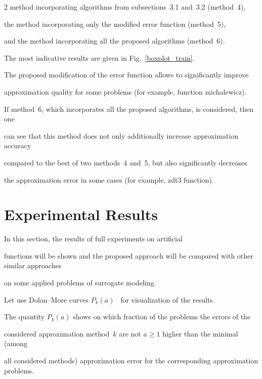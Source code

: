 \begin{multicols}{2}
method incorporating algorithms from subsections~3.1 and~3.2 (method~4), 

the method incorporating only the modified error function (method~5),  

and the method incorporating all the proposed algorithms  (method~6).







The most indicative results are given in Fig.~\ref{boxplot_train}.

The proposed modification of the error function allows to significantly improve 

approximation quality for some problems (for example, function michalewicz).

If method~6, which incorporates all the proposed algorithms,   is considered, then one 

can see that this method does not only additionally increase approximation accuracy 

compared to the best of two methods~4 and~5, but also significantly decreases 

the approximation error in some cases (for example, zdt3 function).



\section{Experimental Results}

\label{experiments}



\noindent

In this section, the results of full experiments on artificial 

functions will be shown and the proposed approach will be compared with other similar approaches 

on some applied problems of surrogate modeling.

Let use Dolan--More curves $P_k(a)$~\cite{DolanMore} for visualization of the results.

The quantity $P_k(a)$ shows on which fraction of the problems the errors of the 

considered approximation method~$k$ are not $a\geq 1$ higher than the minimal (among 

all considered methods) approximation error for the corresponding approximation problems.

{ %



}
\end{multicols}
